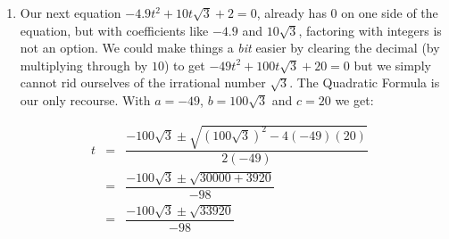 \documentclass{ximera}
\begin{document}
\begin{ex}
\begin{enumerate}
\[\begin{array}{rclr}
100x^2 - 420x + 441 & = & 0 & \text{Gather like terms} \\  

\end{array} \]

With highly composite numbers like $100$ and $441$, factoring seems inefficient at best,\footnote{This is actually the Perfect Square Trinomial $(10x - 21)^2$.} so we apply the Quadratic Formula with $a = 100$, $b = -420$ and $c = 441$:\[ \begin{array}{rclr}

x & = & \dfrac{-(-420) \pm \sqrt{(-420)^2 - 4(100)(441)}}{2(100)} & \\ [12pt]

 & = & \dfrac{420 \pm \sqrt{176000 - 176400}}{200} & \\ [12pt]

& = & \dfrac{420 \pm \sqrt{0}}{200} & \\ [12pt]

& = & \dfrac{420 \pm 0}{200} & \\ [12pt]
& = & \dfrac{420}{200} & \\ [12pt]

& = & \dfrac{21}{10} & \\

\end{array} \]

To our surprise and delight we obtain just one answer, $x = \frac{21}{10}$.

\item  Our next equation $-4.9t^2 + 10t\sqrt{3} + 2 = 0$, already has $0$ on one side of the equation, but with coefficients like $-4.9$ and $10\sqrt{3}$, factoring with integers is not an option.  We could make things a \textit{bit} easier by clearing the decimal (by multiplying through by $10$) to get  $-49t^2 + 100t\sqrt{3} + 20 = 0$ but we simply cannot rid ourselves of the irrational number $\sqrt{3}$.  The Quadratic Formula is our only recourse.  With $a = -49$, $b = 100\sqrt{3}$ and $c = 20$ we get: 

\[ \begin{array}{rclr}

t & = &  \dfrac{-100\sqrt{3} \pm \sqrt{(100\sqrt{3})^2 - 4(-49)(20)}}{2(-49)} & \\ [10pt]

& = &  \dfrac{-100\sqrt{3} \pm \sqrt{30000 +3920}}{-98}  & \\ [10pt]

& = &  \dfrac{-100\sqrt{3} \pm \sqrt{33920}}{-98}  & \\ [10pt]


\end{array}\]
\end{enumerate}
\end{ex}
\end{document}
